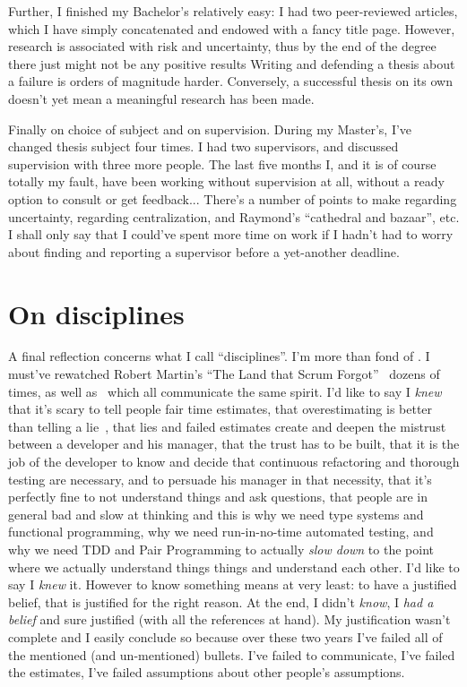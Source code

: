 Further, I finished my Bachelor's relatively easy: I had two peer-reviewed
articles, which I have simply concatenated and endowed with a fancy title page.
However, research is associated with risk and uncertainty, thus by the end of
the degree there just might not be any positive results
Writing and defending a thesis about a failure is orders of magnitude harder.
Conversely, a successful thesis on its own doesn't yet mean a meaningful
research has been made.

Finally on choice of subject and on supervision. During my Master's, I've
changed thesis subject four times.  I had two supervisors, and discussed
supervision with three more people. The last five months I, and it is of course
totally my fault, have been working without supervision at all, without a ready
option to consult or get feedback... There's a number of points to make
regarding uncertainty, regarding centralization, and Raymond's ``cathedral and
bazaar'', etc. I shall only say that I could've spent more time on work if I
hadn't had to worry about finding and reporting a supervisor before a
yet-another deadline.

\section*{On disciplines}

A final reflection concerns what I call ``disciplines''.  I'm more than fond of
\citet{c2wiki}. I must've rewatched Robert Martin's ``The Land that Scrum
Forgot''~\cite{unclebobScrum} dozens of times, as well
as~\citet{unclebobProfessionalism,unclebobFuture,unclebobPrinciples,unclebobFunctional,unclebobCoplienTDD,unclebobTDD,unclebobHowNotToLie}
which all communicate the same spirit. I'd like to say I \emph{knew}
that it's scary to tell people fair time estimates,
that overestimating is better than telling a lie~\cite{unclebobHowNotToLie},
that lies and failed estimates create and deepen the mistrust between a
developer and his manager, that the trust has to be built, that it is the job
of the developer to know and decide that continuous refactoring and thorough
testing are necessary, and to persuade his manager in that necessity, that it's
perfectly fine to not understand things and ask questions, that people are in general
bad and slow at thinking and this is why we need type systems and functional programming,
why we need run-in-no-time automated testing, and why we need TDD and Pair Programming
to actually \emph{slow down} to the point where we actually understand things things
and understand each other. I'd like to say I \emph{knew} it. However to know something
means at very least: to have a justified belief, that is justified for the
right reason.  At the end, I didn't \emph{know}, I \emph{had a belief} and sure
justified (with all the references at hand). My justification wasn't complete
and I easily conclude so because over these two years I've failed all of the
mentioned (and un-mentioned) bullets. I've failed to communicate, I've failed
the estimates, I've failed assumptions about other people's assumptions.

